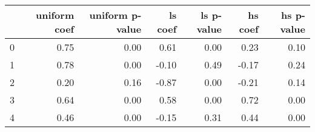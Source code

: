 \begin{tabular}{lrrrrrr}
\toprule
 & uniform coef & uniform p-value & ls coef & ls p-value & hs coef & hs p-value \\
\midrule
0 & 0.75 & 0.00 & 0.61 & 0.00 & 0.23 & 0.10 \\
1 & 0.78 & 0.00 & -0.10 & 0.49 & -0.17 & 0.24 \\
2 & 0.20 & 0.16 & -0.87 & 0.00 & -0.21 & 0.14 \\
3 & 0.64 & 0.00 & 0.58 & 0.00 & 0.72 & 0.00 \\
4 & 0.46 & 0.00 & -0.15 & 0.31 & 0.44 & 0.00 \\
\bottomrule
\end{tabular}
